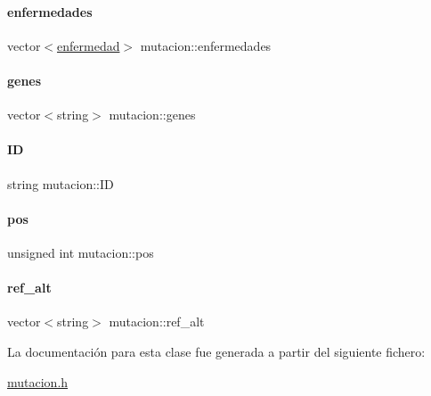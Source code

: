 \hypertarget{classmutacion_a0decaa0406675999e766f913e6347d79}{}\label{classmutacion_a0decaa0406675999e766f913e6347d79} 
\paragraph{\texorpdfstring{enfermedades}{enfermedades}}
{\footnotesize\ttfamily vector$<$\hyperlink{classenfermedad}{enfermedad}$>$ mutacion\+::enfermedades\hspace{0.3cm}{\ttfamily [private]}}

\hypertarget{classmutacion_a65fb9e2186d1c54d490289661b141aa1}{}\label{classmutacion_a65fb9e2186d1c54d490289661b141aa1} 
\paragraph{\texorpdfstring{genes}{genes}}
{\footnotesize\ttfamily vector$<$string$>$ mutacion\+::genes\hspace{0.3cm}{\ttfamily [private]}}

\hypertarget{classmutacion_aafc39218473e0f21eb0c3dc05dd4f35e}{}\label{classmutacion_aafc39218473e0f21eb0c3dc05dd4f35e} 
\paragraph{\texorpdfstring{ID}{ID}}
{\footnotesize\ttfamily string mutacion\+::\+ID\hspace{0.3cm}{\ttfamily [private]}}

\hypertarget{classmutacion_ae1487b8648d0eaad68de5e4e5a87f3ff}{}\label{classmutacion_ae1487b8648d0eaad68de5e4e5a87f3ff} 
\paragraph{\texorpdfstring{pos}{pos}}
{\footnotesize\ttfamily unsigned int mutacion\+::pos\hspace{0.3cm}{\ttfamily [private]}}

\hypertarget{classmutacion_abeb13e023fc9a34120106bccf58d5086}{}\label{classmutacion_abeb13e023fc9a34120106bccf58d5086} 
\paragraph{\texorpdfstring{ref\+\_\+alt}{ref\_alt}}
{\footnotesize\ttfamily vector$<$string$>$ mutacion\+::ref\+\_\+alt\hspace{0.3cm}{\ttfamily [private]}}



La documentación para esta clase fue generada a partir del siguiente fichero\+:\begin{DoxyCompactItemize}
\item 
\hyperlink{mutacion_8h}{mutacion.\+h}\end{DoxyCompactItemize}
